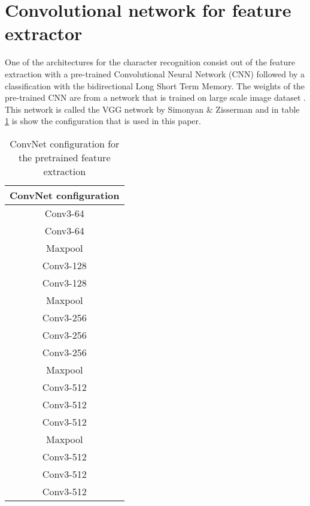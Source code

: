 \section{Convolutional network for feature extractor}
One of the architectures for the character recognition consist out of the feature extraction with a pre-trained Convolutional Neural Network (CNN) followed by a classification with the bidirectional Long Short Term Memory. The weights of the pre-trained CNN are from a network that is trained on large scale image dataset \cite{simonyan2014}. This network is called the VGG network by Simonyan \& Zisserman and in table \ref{Tab:convconf} is show the configuration that is used in this paper.    
\begin{table}
\begin{tabular}{|c|}\hline
ConvNet configuration \\\hline
Conv3-64\\
Conv3-64\\\hline
Maxpool\\\hline
Conv3-128\\
Conv3-128\\\hline
Maxpool\\\hline
Conv3-256\\
Conv3-256\\
Conv3-256\\\hline
Maxpool\\\hline
Conv3-512\\
Conv3-512\\
Conv3-512\\\hline
Maxpool\\\hline
Conv3-512\\
Conv3-512\\
Conv3-512\\
\end{tabular}
\caption{ConvNet configuration for the pretrained feature extraction}
\label{Tab:convconf}
\end{table}
